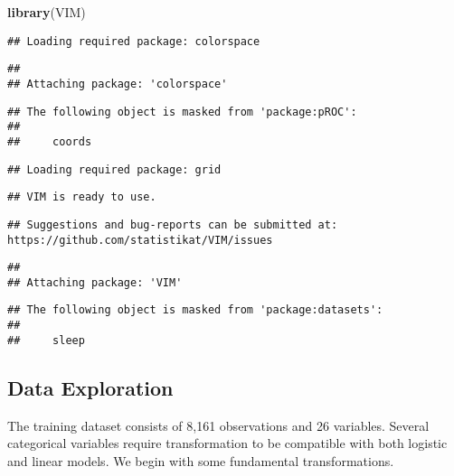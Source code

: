 \documentclass[
]{article}
\newenvironment{Shaded}{\begin{snugshade}}{\end{snugshade}}
\newcommand{\FunctionTok}[1]{\textcolor[rgb]{0.13,0.29,0.53}{\textbf{#1}}}
\newcommand{\NormalTok}[1]{#1}
\begin{document}
\begin{Shaded}
\begin{Highlighting}[]
\FunctionTok{library}\NormalTok{(VIM)}
\end{Highlighting}
\end{Shaded}

\begin{verbatim}
## Loading required package: colorspace
\end{verbatim}

\begin{verbatim}
## 
## Attaching package: 'colorspace'
\end{verbatim}

\begin{verbatim}
## The following object is masked from 'package:pROC':
## 
##     coords
\end{verbatim}

\begin{verbatim}
## Loading required package: grid
\end{verbatim}

\begin{verbatim}
## VIM is ready to use.
\end{verbatim}

\begin{verbatim}
## Suggestions and bug-reports can be submitted at: https://github.com/statistikat/VIM/issues
\end{verbatim}

\begin{verbatim}
## 
## Attaching package: 'VIM'
\end{verbatim}

\begin{verbatim}
## The following object is masked from 'package:datasets':
## 
##     sleep
\end{verbatim}

\subsection{Data Exploration}\label{data-exploration}

The training dataset consists of 8,161 observations and 26 variables.
Several categorical variables require transformation to be compatible
with both logistic and linear models. We begin with some fundamental
transformations.
\end{document}

